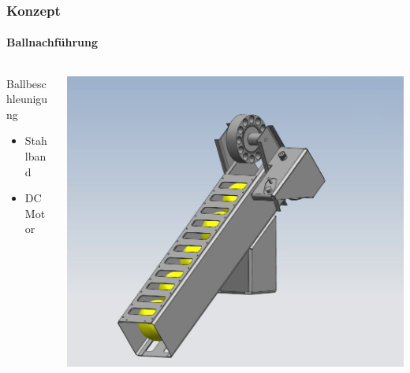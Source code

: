 \begin{frame}
	\frametitle{Konzept}
	\framesubtitle{Ballnachführung}
	\begin{columns}
		\begin{column}{0.4\textwidth}
			\begin{block}{Ballbeschleunigung}
				\begin{itemize}
					\item Stahlband
					\item DC Motor
				\end{itemize}
			\end{block}
			\centering
			\rule{0pt}{0.8\textwidth}
		\end{column}
		\begin{column}{0.6\textwidth}
			\centering
			\includegraphics[height=0.8\textwidth, trim = 40mm 0mm 60mm 30mm, clip]{../doc/fig/Balllager.jpg}
		\end{column}
	\end{columns}
\end{frame}